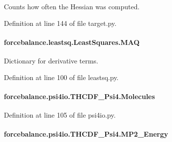Counts how often the Hessian was computed. 



Definition at line 144 of file target.\-py.

\hypertarget{classforcebalance_1_1leastsq_1_1LeastSquares_a7f08641f45285414b080f21ed278f31e}{
\paragraph[{M\-A\-Q}]{\setlength{\rightskip}{0pt plus 5cm}forcebalance.\-leastsq.\-Least\-Squares.\-M\-A\-Q\hspace{0.3cm}{\ttfamily [inherited]}}}\label{classforcebalance_1_1leastsq_1_1LeastSquares_a7f08641f45285414b080f21ed278f31e}


Dictionary for derivative terms. 



Definition at line 100 of file leastsq.\-py.

\hypertarget{classforcebalance_1_1psi4io_1_1THCDF__Psi4_a3f3231f0970970f6ce93c87673728fcd}{
\paragraph[{Molecules}]{\setlength{\rightskip}{0pt plus 5cm}forcebalance.\-psi4io.\-T\-H\-C\-D\-F\-\_\-\-Psi4.\-Molecules}}\label{classforcebalance_1_1psi4io_1_1THCDF__Psi4_a3f3231f0970970f6ce93c87673728fcd}


Definition at line 105 of file psi4io.\-py.

\hypertarget{classforcebalance_1_1psi4io_1_1THCDF__Psi4_a88f28862f46d19b0c36fc22967265715}{
\paragraph[{M\-P2\-\_\-\-Energy}]{\setlength{\rightskip}{0pt plus 5cm}forcebalance.\-psi4io.\-T\-H\-C\-D\-F\-\_\-\-Psi4.\-M\-P2\-\_\-\-Energy}}\label{classforcebalance_1_1psi4io_1_1THCDF__Psi4_a88f28862f46d19b0c36fc22967265715}


